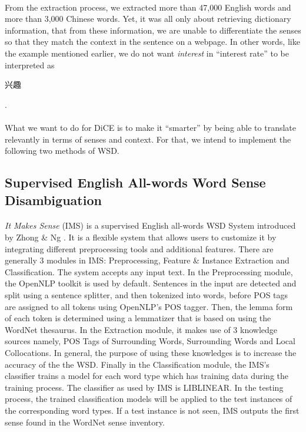 \documentclass[12 pt]{article}
\begin{document}
\paragraph{}
From the extraction process, we extracted more than 47,000 English words and more than 3,000 Chinese words. Yet, it was all only about retrieving dictionary information, that from these information, we are unable to differentiate the senses so that they match the context in the sentence on a webpage. In other words, like the example mentioned earlier, we do not want \textit{interest} in ``interest rate'' to be interpreted as \begin{CJK}{UTF8}{gbsn}兴趣\end{CJK}.
\paragraph{}
What we want to do for DiCE is to make it ``smarter'' by being able to translate relevantly in terms of senses and context. For that, we intend to implement the following two methods of WSD.

\subsection{Supervised English All-words Word Sense Disambiguation}
\label{itmakessense}
\paragraph{}
\textit{It Makes Sense} (IMS) is a supervised English all-words WSD System introduced by Zhong \& Ng \cite{itmakessense}. It is a flexible system that allows users to customize it by integrating different preprocessing tools and additional features. There are generally 3 modules in IMS: Preprocessing, Feature \& Instance Extraction and Classification. The system accepts any input text. In the Preprocessing module, the OpenNLP toolkit is used by default. Sentences in the input are detected and split using a sentence splitter, and then tokenized into words, before POS tags are assigned to all tokens using OpenNLP's POS tagger. Then, the lemma form of each token is determined using a lemmatizer that is based on using the WordNet thesaurus. In the Extraction module, it makes use of 3 knowledge sources namely, POS Tags of Surrounding Words, Surrounding Words and Local Collocations. In general, the purpose of using these knowledges is to increase the accuracy of the the WSD. Finally in the Classification module, the IMS's classifier trains a model for each word type which has training data during the training process. The classifier as used by IMS is LIBLINEAR. In the testing process, the trained classification models will be applied to the test instances of the corresponding word types. If a test instance is not seen, IMS outputs the first sense found in the WordNet sense inventory.
\end{document}
